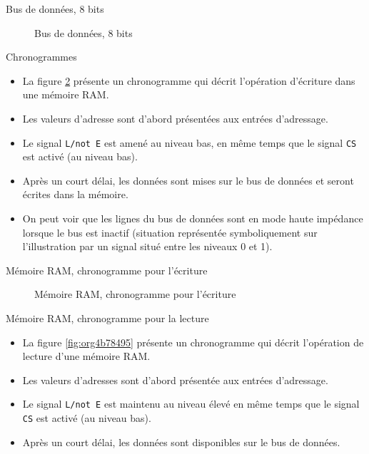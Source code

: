 \documentclass[presentation]{beamer}
\begin{document}
\begin{frame}[label={sec:org51a5cc7}]{Bus de données, 8 bits}
\begin{figure}[htbp]
\centering

\caption{\label{fig:org2201e67}Bus de données, 8 bits}
\end{figure}
\end{frame}

\begin{frame}[label={sec:orgbe21a6a},fragile]{Chronogrammes}
 \begin{itemize}
\item La figure \ref{fig:org2e887a9} présente un chronogramme qui décrit l'opération d'écriture dans une mémoire RAM.

\item Les valeurs d'adresse sont d'abord présentées aux entrées d'adressage.

\item Le signal \texttt{L/not E} est amené au niveau bas, en même temps que le signal \texttt{CS} est activé (au niveau bas).

\item Après un court délai, les données sont mises sur le bus de données et seront écrites dans la mémoire.

\item On peut voir que les lignes du bus de données sont en mode \alert{haute impédance} lorsque le bus est inactif (situation représentée symboliquement sur l'illustration par un signal situé entre les niveaux 0 et 1).
\end{itemize}
\end{frame}

\begin{frame}[label={sec:orgd722c31}]{Mémoire RAM, chronogramme pour l'écriture}
\begin{figure}[htbp]
\centering

\caption{\label{fig:org2e887a9}Mémoire RAM, chronogramme pour l'écriture}
\end{figure}
\end{frame}

\begin{frame}[label={sec:orgb8b394d},fragile]{Mémoire RAM, chronogramme pour la lecture}
 \begin{itemize}
\item La figure \ref{fig:org4b78495} présente un chronogramme qui décrit l'opération de lecture d'une mémoire RAM.

\item Les valeurs d'adresses sont d'abord présentée aux entrées d'adressage.

\item Le signal \texttt{L/not E} est maintenu au niveau élevé en même temps que le signal \texttt{CS} est activé (au niveau bas).

\item Après un court délai, les données sont disponibles sur le bus de données.
\end{itemize}
\end{frame}
\end{document}

